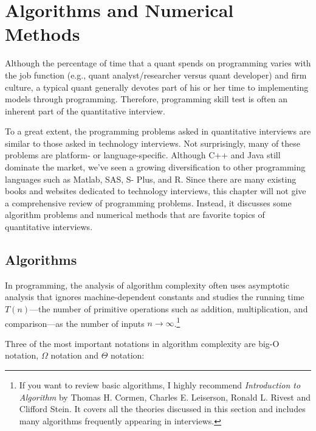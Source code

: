 

\section{Algorithms and Numerical Methods}

Although the percentage of time that a quant spends on programming varies with the job
function (e.g., quant analyst/researcher versus quant developer) and firm culture, a
typical quant generally devotes part of his or her time to implementing models through
programming. Therefore, programming skill test is often an inherent part of the
quantitative interview.

To a great extent, the programming problems asked in quantitative interviews are similar
to those asked in technology interviews. Not surprisingly, many of these problems are
platform- or language-specific. Although C++ and Java still dominate the market, we've
seen a growing diversification to other programming languages such as Matlab, SAS, S-
Plus, and R. Since there are many existing books and websites dedicated to technology
interviews, this chapter will not give a comprehensive review of programming problems.
Instead, it discusses some algorithm problems and numerical methods that are favorite
topics of quantitative interviews.

\subsection{Algorithms}

In programming, the analysis of algorithm complexity often uses asymptotic analysis
that ignores machine-dependent constants and studies the running time $T(n)$---the
number of primitive operations such as addition, multiplication, and comparison---as the
number of inputs $n\to\infty$.\footnote[1]{If you want to review basic algorithms, I highly recommend
\emph{Introduction to Algorithm} by Thomas H. Cormen, Charles E. Leiserson, Ronald L. Rivest and
Clifford Stein. It covers all the theories discussed in this section and includes many algorithms
frequently appearing in interviews.}

Three of the most important notations in algorithm complexity are big-O notation,
$\Omega$ notation and $\Theta$ notation:

